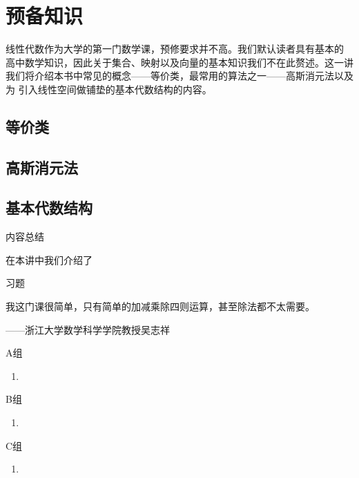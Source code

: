 \chapter{预备知识}

\indent 线性代数作为大学的第一门数学课，预修要求并不高。我们默认读者具有基本的
高中数学知识，因此关于集合、映射以及向量的基本知识我们不在此赘述。这一讲
我们将介绍本书中常见的概念——等价类，最常用的算法之一——高斯消元法以及为
引入线性空间做铺垫的基本代数结构的内容。

\section{等价类}


\section{高斯消元法}


\section{基本代数结构}


\vspace{2ex} 
\centerline{\heiti \Large 内容总结}
\vspace{2ex} 

在本讲中我们介绍了

\centerline{\heiti \Large 习题}
\vspace{2ex} 
{\kaishu 我这门课很简单，只有简单的加减乘除四则运算，甚至除法都不太需要。}
\begin{flushright}
    \kaishu
	——浙江大学数学科学学院教授吴志祥
\end{flushright}
\centerline{\heiti A组}
\begin{enumerate}
	\item 
\end{enumerate}
\centerline{\heiti B组}
\begin{enumerate}
	\item 
\end{enumerate}
\centerline{\heiti C组}
\begin{enumerate}
	\item 
\end{enumerate}